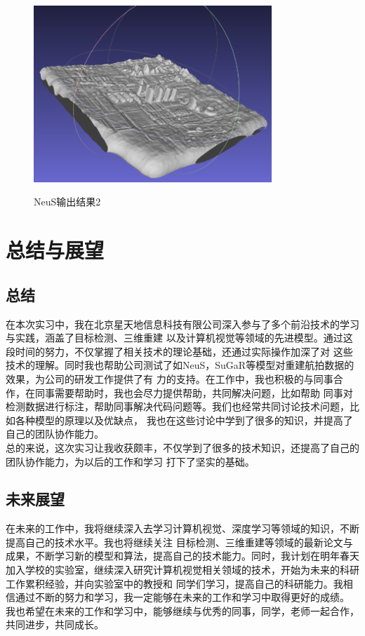\documentclass{nwputhesis}
\begin{document}
\begin{figure}[H]
    \centering
    {\includegraphics[width=0.8\textwidth]{picture/36.png}}
    \caption{NeuS输出结果2}
\end{figure}




\makespace
\section{总结与展望}
\subsection{总结}
在本次实习中，我在北京星天地信息科技有限公司深入参与了多个前沿技术的学习与实践，涵盖了目标检测、三维重建
以及计算机视觉等领域的先进模型。通过这段时间的努力，不仅掌握了相关技术的理论基础，还通过实际操作加深了对
这些技术的理解。同时我也帮助公司测试了如NeuS，SuGaR等模型对重建航拍数据的效果，为公司的研发工作提供了有
力的支持。在工作中，我也积极的与同事合作，在同事需要帮助时，我也会尽力提供帮助，共同解决问题，比如帮助
同事对检测数据进行标注，帮助同事解决代码问题等。我们也经常共同讨论技术问题，比如各种模型的原理以及优缺点，
我也在这些讨论中学到了很多的知识，并提高了自己的团队协作能力。\\
\indent
总的来说，这次实习让我收获颇丰，不仅学到了很多的技术知识，还提高了自己的团队协作能力，为以后的工作和学习
打下了坚实的基础。

\subsection{未来展望}
在未来的工作中，我将继续深入去学习计算机视觉、深度学习等领域的知识，不断提高自己的技术水平。我也将继续关注
目标检测、三维重建等领域的最新论文与成果，不断学习新的模型和算法，提高自己的技术能力。同时，我计划在明年春天
加入学校的实验室，继续深入研究计算机视觉相关领域的技术，开始为未来的科研工作累积经验，并向实验室中的教授和
同学们学习，提高自己的科研能力。我相信通过不断的努力和学习，我一定能够在未来的工作和学习中取得更好的成绩。
我也希望在未来的工作和学习中，能够继续与优秀的同事，同学，老师一起合作，共同进步，共同成长。
\end{document}
